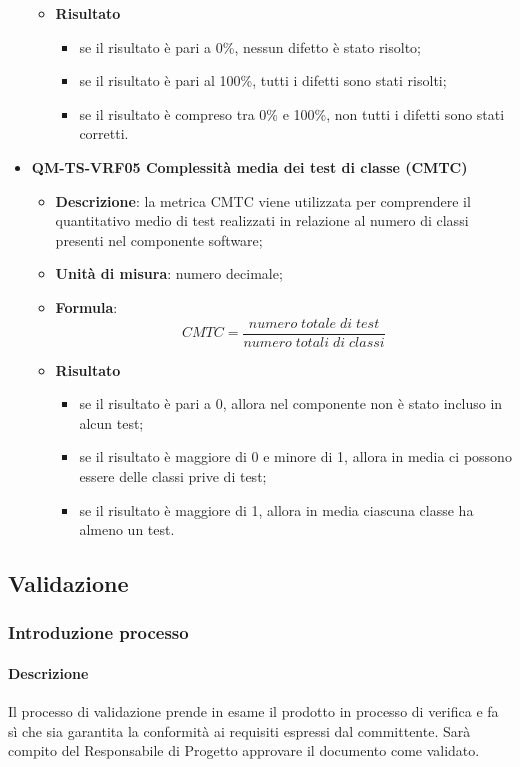 \begin{itemize}
\begin{itemize}
							\item\textbf{Risultato}
								\begin{itemize}
									\item se il risultato è pari a 0\%, nessun difetto è stato risolto;
									\item se il risultato è pari al 100\%, tutti i difetti sono stati risolti;
									\item se il risultato è compreso tra 0\% e 100\%, non tutti i difetti sono stati corretti.
								\end{itemize}
						\end{itemize}
					\item\textbf{QM-TS-VRF05 Complessità media dei test di classe (CMTC)}
						\begin{itemize}
							\item\textbf{Descrizione}: la metrica CMTC viene utilizzata per comprendere il quantitativo medio di test realizzati in relazione al numero di classi presenti nel componente software;
							\item\textbf{Unità di misura}: numero decimale;
							\item\textbf{Formula}: 
								\[ CMTC = \frac{\mathit{numero\;totale\;di\;test}}{\mathit{numero\;totali\;di\;classi}} \]
							\item\textbf{Risultato}
								\begin{itemize}
									\item se il risultato è pari a 0, allora nel componente non è stato incluso in alcun test;
									\item se il risultato è maggiore di 0 e minore di 1, allora in media ci possono essere delle classi prive di test;
									\item se il risultato è maggiore di 1, allora in media ciascuna classe ha almeno un test.
								\end{itemize}
						\end{itemize}
				\end{itemize}
\fi
	\subsection{Validazione}
		\subsubsection{Introduzione processo}
			\paragraph{Descrizione}
				Il processo di validazione prende in esame il prodotto in processo di verifica e fa sì che sia garantita la conformità ai requisiti espressi dal committente. Sarà compito del Responsabile di Progetto approvare il documento come validato.
